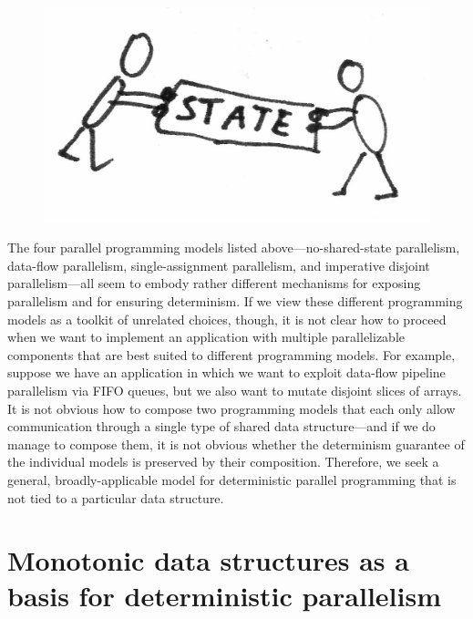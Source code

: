 \ifdefined\DISSERTATION
\begin{figure}
\vspace{-2em}
\begin{center}
  \includegraphics[scale=0.18]{../illustrations/sharing-state}
\end{center}
\vspace{-1.5em}
\end{figure}
\fi
The four parallel programming models listed above---no-shared-state
parallelism, data-flow parallelism, single-assignment parallelism, and
imperative disjoint parallelism---all seem to embody rather different
mechanisms for exposing parallelism and for ensuring determinism.  If
we view these different programming models as a toolkit of unrelated
choices, though, it is not clear how to proceed when we want to
implement an application with multiple parallelizable components that
are best suited to different programming models.  For example, suppose
we have an application in which we want to exploit data-flow pipeline
parallelism via FIFO queues, but we also want to mutate disjoint slices of
arrays.  It is not obvious how to compose two programming models that
each only allow communication through a single type of shared data
structure---and if we do manage to compose them, it is not obvious whether the
determinism guarantee of the individual models is preserved by their
composition.  Therefore, we seek a general, broadly-applicable model
for deterministic parallel programming that is not tied to a
particular data structure.

\section{Monotonic data structures as a basis for deterministic parallelism}\label{s:intro-monotonic}

